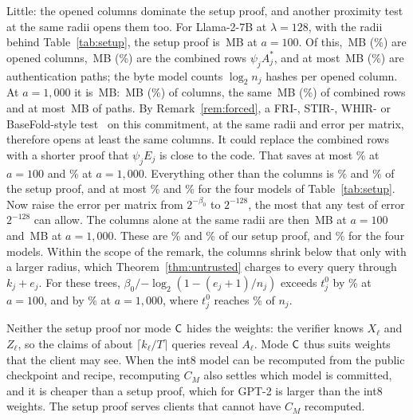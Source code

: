  Little: the opened columns dominate the setup proof,
and another proximity test at the same radii opens them too. For Llama-2-7B at $\lambda=128$, with the radii behind
Table~\ref{tab:setup}, the setup proof is \SetupMBLlamaA{}\,MB at $a=100$. Of this, \SetupColumnsMBLlamaA{}\,MB (\SetupColumnsShareLlamaA{}\%)
are opened columns, \SetupCombinedMBLlama{}\,MB (\SetupCombinedShareLlamaA{}\%) are the combined rows $\psi_jA^*_j$, and at most \SetupPathsMBLlamaA{}\,MB
(\SetupPathsShareLlamaA{}\%) are authentication paths; the byte model counts $\log_2n_j$ hashes per opened column. At
$a=1{,}000$ it is \SetupMBLlamaB{}\,MB: \SetupColumnsMBLlamaB{}\,MB (\SetupColumnsShareLlamaB{}\%) of columns, the same \SetupCombinedMBLlama{}\,MB (\SetupCombinedShareLlamaB{}\%) of
combined rows and at most \SetupPathsMBLlamaB{}\,MB of paths. By Remark~\ref{rem:forced}, a FRI-, STIR-, WHIR- or
BaseFold-style test~\cite{fri2018,basefold} on this commitment, at the same radii and error per matrix, therefore opens at
least the same columns. It could replace the combined rows with a shorter proof that $\psi_jE_j$ is
close to the code. That saves at most \SetupCombinedShareLlamaA{}\% at $a=100$ and \SetupCombinedShareLlamaB{}\% at $a=1{,}000$. Everything other
than the columns is \SetupNonColumnsShareLlamaA{}\% and \SetupNonColumnsShareLlamaB{}\% of the setup proof, and at most \SetupNonColumnsShareMaxA{}\% and \SetupNonColumnsShareMaxB{}\% for the four
models of Table~\ref{tab:setup}. Now raise the error per matrix from $2^{-\beta_0}$ to $2^{-128}$,
the most that any test of error $2^{-128}$ can allow. The columns alone at the same radii are then
\SetupAtLamMBLlamaA{}\,MB at $a=100$ and \SetupAtLamMBLlamaB{}\,MB at $a=1{,}000$. These are \SetupAtLamShareLlamaA{}\% and \SetupAtLamShareLlamaB{}\% of our setup
proof, and \SetupAtLamShareRange{}\% for the four models. Within the scope of the remark, the columns shrink
below that only with a larger radius, which Theorem~\ref{thm:untrusted} charges to every query
through $k_j+e_j$. For these trees, $\beta_0/{-\log_2(1-(e_j+1)/n_j)}$ exceeds $t^0_j$ by \SetupReplacementExcessA{}\% at
$a=100$, and by \SetupReplacementExcessB{}\% at $a=1{,}000$, where $t^0_j$ reaches \SetupTZeroMaxShareB{}\% of $n_j$.

 Neither the setup proof nor mode $\mathsf{C}$ hides the weights: the verifier knows $X_\ell$
and $Z_\ell$, so the claims of about $\lceil k_\ell/T\rceil$ queries reveal $A_\ell$. Mode $\mathsf{C}$
thus suits weights that the client may see. When the int8 model can be recomputed from the public
checkpoint and recipe, recomputing $C_M$ also settles which model is committed, and it is cheaper
than a setup proof, which for GPT-2 is larger than the int8 weights. The setup proof serves
clients that cannot have $C_M$ recomputed.

